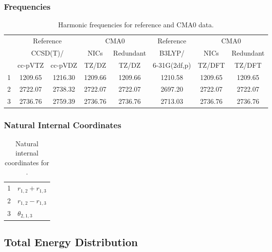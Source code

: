 \documentclass[10pt,oneside]{article}
\begin{document}
\begin{table}[h!]
\subsubsection*{Frequencies}
\centering
\caption{Harmonic frequencies for reference and CMA0 data.}
\begin{tabular}{cccccccc}
\toprule
{} & \multicolumn{2}{c}{Reference} & \multicolumn{2}{c}{CMA0} &    Reference & \multicolumn{2}{c}{CMA0} \\
{} & \multicolumn{2}{c}{CCSD(T)/} &    NICs &  Redundant &       B3LYP/ &    NICs & Redundant \\
{} &   cc-pVTZ & cc-pVDZ &   TZ/DZ &      TZ/DZ & 6-31G(2df,p) &  TZ/DFT &    TZ/DFT \\
\midrule
1 &   1209.65 & 1216.30 & 1209.66 &    1209.66 &      1210.58 & 1209.65 &   1209.65 \\
2 &   2722.07 & 2738.32 & 2722.07 &    2722.07 &      2697.20 & 2722.07 &   2722.07 \\
3 &   2736.76 & 2759.39 & 2736.76 &    2736.76 &      2713.03 & 2736.76 &   2736.76 \\
\bottomrule
\end{tabular}
\end{table}

\begin{table}[h!]
\subsubsection*{Natural Internal Coordinates}
\centering
\caption{Natural internal coordinates for .}
\small
\begin{tabular}{ll}
\toprule
  1   & $r_{1,2} + r_{1,3}$ \\
  2   & $r_{1,2} - r_{1,3}$ \\
  3   & $\theta_{2,1,3}$ \\
\bottomrule
\end{tabular}
\end{table}

\begin{table}
\subsection*{Total Energy Distribution}
\centering\end{table}

\clearpage

\subsection{}
\end{document}
